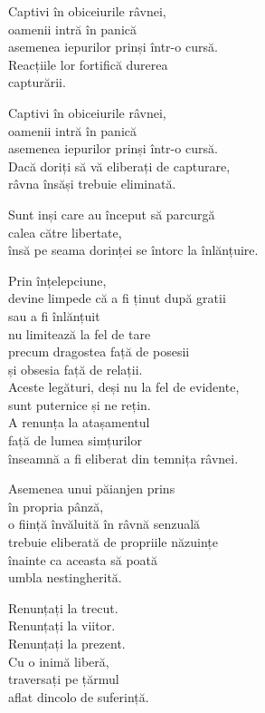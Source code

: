 Captivi în obiceiurile râvnei,\\
oamenii intră în panică\\
asemenea iepurilor prinși într-o cursă.\\
Reacțiile lor fortifică durerea\\
capturării.


Captivi în obiceiurile râvnei,\\
oamenii intră în panică\\
asemenea iepurilor prinși într-o cursă.\\
Dacă doriți să vă eliberați de capturare,\\
râvna însăși trebuie eliminată.


Sunt inși care au început să parcurgă\\
calea către libertate,\\
însă pe seama dorinței se întorc la înlănțuire.


Prin înțelepciune,\\
devine limpede că a fi ținut după gratii\\
sau a fi înlănțuit\\
nu limitează la fel de tare\\
precum dragostea față de posesii\\
și obsesia față de relații.\\
Aceste legături, deși nu la fel de evidente,\\
sunt puternice și ne rețin.\\
A renunța la atașamentul\\
față de lumea simțurilor\\
înseamnă a fi eliberat din temnița râvnei.


Asemenea unui păianjen prins\\
în propria pânză,\\
o ființă învăluită în râvnă senzuală\\
trebuie eliberată de propriile năzuințe\\
înainte ca aceasta să poată\\
umbla nestingherită.


Renunțați la trecut.\\
Renunțați la viitor.\\
Renunțați la prezent.\\
Cu o inimă liberă,\\
traversați pe țărmul\\
aflat dincolo de suferință.


